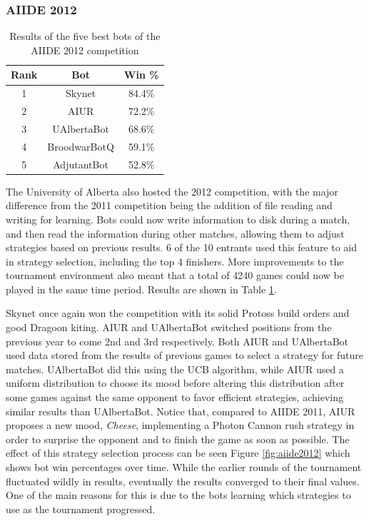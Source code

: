 \documentclass{llncs}
\begin{document}
\subsubsection{AIIDE 2012}

\begin{table}[!t]
\caption{Results of the five best bots of the AIIDE 2012 competition}
\label{tab:aiide2012}
\centering
\begin{tabular}{|c|c|c|}
\hline
{\bfseries Rank} & {\bfseries Bot} & {\bfseries Win \%} \\
\hline
1 & Skynet & 84.4\% \\
2 & AIUR & 72.2\% \\
3 & UAlbertaBot & 68.6\% \\
4 & BroodwarBotQ & 59.1\% \\
5 & AdjutantBot & 52.8\% \\
\hline
\end{tabular}
\end{table}

The University of Alberta also hosted the 2012 competition, with the major difference from the 2011
competition being the addition of file reading and writing for learning. Bots could now write information to disk during a
match, and then read the information during other matches, allowing them to adjust strategies based
on previous results. 6 of the 10 entrants used this feature to aid in strategy selection, including the
top 4 finishers. More improvements to the tournament environment also meant that a total of 4240 games
could now be played in the same time period. Results are shown in Table \ref{tab:aiide2012}.

Skynet once  again won  the competition with  its solid  Protoss build
orders  and  good  Dragoon  kiting.   AIUR  and  UAlbertaBot  switched
positions from  the previous  year to come  2nd and  3rd respectively.
Both  AIUR  and UAlbertaBot  used  data  stored  from the  results  of
previous games  to select a strategy for  future matches.  UAlbertaBot
did  this  using  the  UCB  \cite{auer2002finite} algorithm,  while  AIUR  used  a  uniform
distribution  to choose  its  mood before  altering this  distribution
after  some  games  against  the  same  opponent  to  favor  efficient
strategies, achieving  similar results than  UAlbertaBot. Notice that,
compared  to AIIDE 2011,  AIUR proposes  a new  mood, \textit{Cheese},
implementing a  Photon Cannon rush  strategy in order to  surprise the
opponent and  to finish the game  as soon as possible.   The effect of
this strategy selection process can be seen Figure \ref{fig:aiide2012}
which shows bot  win percentages over time.  While  the earlier rounds
of the tournament fluctuated wildly in results, eventually the results
converged to their  final values. One of the main  reasons for this is
due to  the bots  learning which strategies  to use as  the tournament
progressed.
\end{document}

